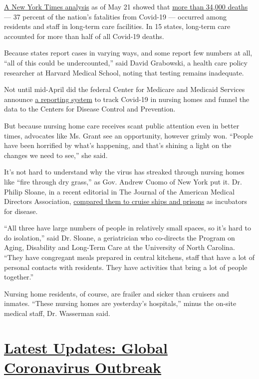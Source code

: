 \href{https://www.nytimes3xbfgragh.onion/interactive/2020/05/09/us/coronavirus-cases-nursing-homes-us.html}{A
New York Times analysis} as of May 21 showed that
\href{https://www.nytimes3xbfgragh.onion/interactive/2020/05/09/us/coronavirus-cases-nursing-homes-us.html}{more
than 34,000 deaths} --- 37 percent of the nation's fatalities from
Covid-19 --- occurred among residents and staff in long-term care
facilities. In 15 states, long-term care accounted for more than half of
all Covid-19 deaths.

Because states report cases in varying ways, and some report few numbers
at all, ``all of this could be undercounted,'' said David Grabowski, a
health care policy researcher at Harvard Medical School, noting that
testing remains inadequate.

Not until mid-April did the federal Center for Medicare and Medicaid
Services announce
\href{https://www.cms.gov/files/document/qso-20-26-nh.pdf}{a reporting
system} to track Covid-19 in nursing homes and funnel the data to the
Centers for Disease Control and Prevention.

But because nursing home care receives scant public attention even in
better times, advocates like Ms. Grant see an opportunity, however
grimly won. ``People have been horrified by what's happening, and that's
shining a light on the changes we need to see,'' she said.

It's not hard to understand why the virus has streaked through nursing
homes like ``fire through dry grass,'' as Gov. Andrew Cuomo of New York
put it. Dr. Philip Sloane, in a recent editorial in The Journal of the
American Medical Directors Association,
\href{https://www.jamda.com/article/S1525-8610(20)30350-9/fulltext}{compared
them to cruise ships and prisons} as incubators for disease.

``All three have large numbers of people in relatively small spaces, so
it's hard to do isolation,'' said Dr. Sloane, a geriatrician who
co-directs the Program on Aging, Disability and Long-Term Care at the
University of North Carolina. ``They have congregant meals prepared in
central kitchens, staff that have a lot of personal contacts with
residents. They have activities that bring a lot of people together.''

Nursing home residents, of course, are frailer and sicker than cruisers
and inmates. ``These nursing homes are yesterday's hospitals,'' minus
the on-site medical staff, Dr. Wasserman said.

\hypertarget{latest-updates-global-coronavirus-outbreak}{%
\section{\texorpdfstring{\href{https://www.nytimes3xbfgragh.onion/2020/08/01/world/coronavirus-covid-19.html?action=click\&pgtype=Article\&state=default\&region=MAIN_CONTENT_1\&context=storylines_live_updates}{Latest
Updates: Global Coronavirus
Outbreak}}{Latest Updates: Global Coronavirus Outbreak}}\label{latest-updates-global-coronavirus-outbreak}}

